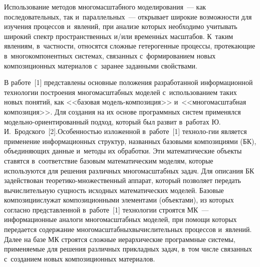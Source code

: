 
  
\vspace*{1pt}



\thispagestyle{headings}

\begin{multicols}{2}

\label{st\stat}

   
   Использование методов многомасштабного моделирования~--- как 
последовательных, так и~параллельных~--- открывает широкие возможности для 
изучения процессов и~явлений, при анализе которых необходимо учитывать 
широкий спектр пространственных и/или временн$\acute{\mbox{ы}}$х масштабов. К~таким 
явлениям, в~частности, относятся сложные гетерогенные процессы, протекающие в~многокомпонентных системах, связанных с~формированием новых 
композиционных материалов с~заранее заданными свойствами.
   
   В работе~[1] представлены основные положения разработанной 
информационной технологии построения многомасштабных моделей 
с~использованием таких новых понятий, как <<базовая  
мо\-дель-ком\-по\-зи\-ция>> и~<<многомасштабная композиция>>. Для создания 
на их основе программных систем применялся  
мо\-дель\-но-ори\-ен\-ти\-ро\-ван\-ный подход, который был развит в~работах 
Ю.\,И.~Бродского~[2].\linebreak Особенностью изложенной в~работе~[1] техноло-\linebreak гии 
является применение информационных структур, названных базовыми 
композициями (БК), объединяющих данные и~методы их обработки. Эти\linebreak 
математические объекты ставятся в~соответствие базовым математическим 
моделям, которые используются для решения различных многомасштабных задач. 
Для описания БК задействован тео\-ре\-ти\-ко-мно\-жест\-вен\-ный аппарат, 
который позволяет передать вычислительную сущность исходных 
математических моделей. Базовые композиции\linebreak служат композиционными 
элементами (объектами), из которых согласно представленной в~работе~[1] 
технологии строятся МК~--- информационные 
аналоги многомасштабных моделей, при помощи которых передается содержание 
многомасштабных\linebreak вычислительных процессов и~явлений. Далее на базе МК 
строятся сложные иерархические про\-граммные системы, применяемые для 
решения различных прикладных задач, в~том числе связанных с~созданием новых 
композиционных материалов.
   

\end{multicols}
